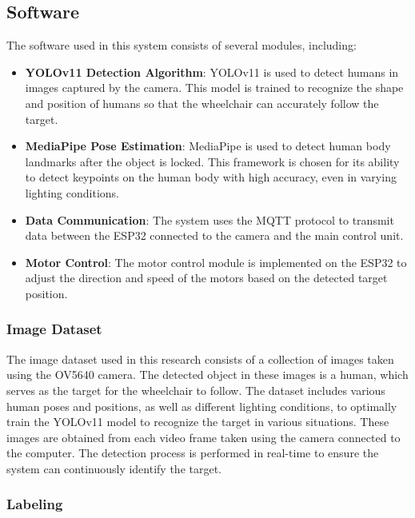 \subsection{Software}
\label{subsec:software}

The software used in this system consists of several modules, including:

\begin{itemize}
    \item \textbf{YOLOv11 Detection Algorithm}: YOLOv11 is used to detect humans in images captured by the camera. This model is trained to recognize the shape and position of humans so that the wheelchair can accurately follow the target.
    \item \textbf{MediaPipe Pose Estimation}: MediaPipe is used to detect human body landmarks after the object is locked. This framework is chosen for its ability to detect keypoints on the human body with high accuracy, even in varying lighting conditions.
    \item \textbf{Data Communication}: The system uses the MQTT protocol to transmit data between the ESP32 connected to the camera and the main control unit.
    \item \textbf{Motor Control}: The motor control module is implemented on the ESP32 to adjust the direction and speed of the motors based on the detected target position.
\end{itemize}

\vspace{5pt}
\subsubsection{Image Dataset}
\label{subsubsec:imagedataset}

The image dataset used in this research consists of a collection of images taken using the OV5640 camera. The detected object in these images is a human, which serves as the target for the wheelchair to follow. The dataset includes various human poses and positions, as well as different lighting conditions, to optimally train the YOLOv11 model to recognize the target in various situations. These images are obtained from each video frame taken using the camera connected to the computer. The detection process is performed in real-time to ensure the system can continuously identify the target.

\vspace{5pt}
\subsubsection{Labeling}
\label{subsubsec:labeling}

